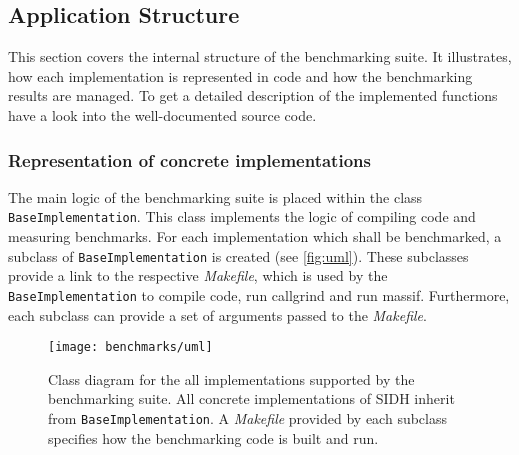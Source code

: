 \subsection{Application Structure}\label{sec:app_structure}

This section covers the internal structure of the benchmarking suite. It illustrates, how each implementation is represented in code and how the benchmarking results are managed. To get a detailed description of the implemented functions have a look into the well-documented source code.

\subsubsection{Representation of concrete implementations}

The main logic of the benchmarking suite is placed within the class \texttt{BaseImplementation}. This class implements the logic of compiling code and measuring benchmarks. For each implementation which shall be benchmarked, a subclass of \texttt{BaseImplementation} is created (see \autoref{fig:uml}). These subclasses provide a link to the respective \textit{Makefile}, which is used by the \texttt{BaseImplementation} to compile code, run callgrind and run massif. Furthermore, each subclass can provide a set of arguments passed to the \textit{Makefile}.\\

\begin{figure}[H]
  \centering
  \texttt{[image: benchmarks/uml]}
  \caption[Class diagram for the all implementations supported by the benchmarking suite.]
  {Class diagram for the all implementations supported by the benchmarking suite. All concrete implementations of SIDH inherit from \texttt{BaseImplementation}. A \textit{Makefile} provided by each subclass specifies how the benchmarking code is built and run.} \label{fig:uml}
\end{figure}

